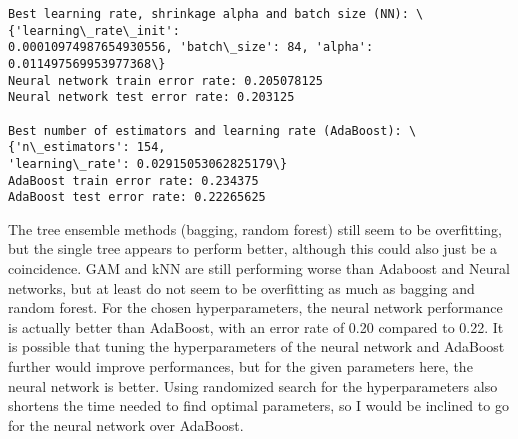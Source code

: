 \documentclass[11pt]{article}
\begin{document}
    \begin{Verbatim}[commandchars=\\\{\}]
Best learning rate, shrinkage alpha and batch size (NN): \{'learning\_rate\_init':
0.00010974987654930556, 'batch\_size': 84, 'alpha': 0.011497569953977368\}
Neural network train error rate: 0.205078125
Neural network test error rate: 0.203125

Best number of estimators and learning rate (AdaBoost): \{'n\_estimators': 154,
'learning\_rate': 0.02915053062825179\}
AdaBoost train error rate: 0.234375
AdaBoost test error rate: 0.22265625

    \end{Verbatim}

    The tree ensemble methods (bagging, random forest) still seem to be
overfitting, but the single tree appears to perform better, although
this could also just be a coincidence. GAM and kNN are still performing
worse than Adaboost and Neural networks, but at least do not seem to be
overfitting as much as bagging and random forest. For the chosen
hyperparameters, the neural network performance is actually better than
AdaBoost, with an error rate of 0.20 compared to 0.22. It is possible
that tuning the hyperparameters of the neural network and AdaBoost
further would improve performances, but for the given parameters here,
the neural network is better. Using randomized search for the
hyperparameters also shortens the time needed to find optimal
parameters, so I would be inclined to go for the neural network over
AdaBoost.


    
    
    
\end{document}
